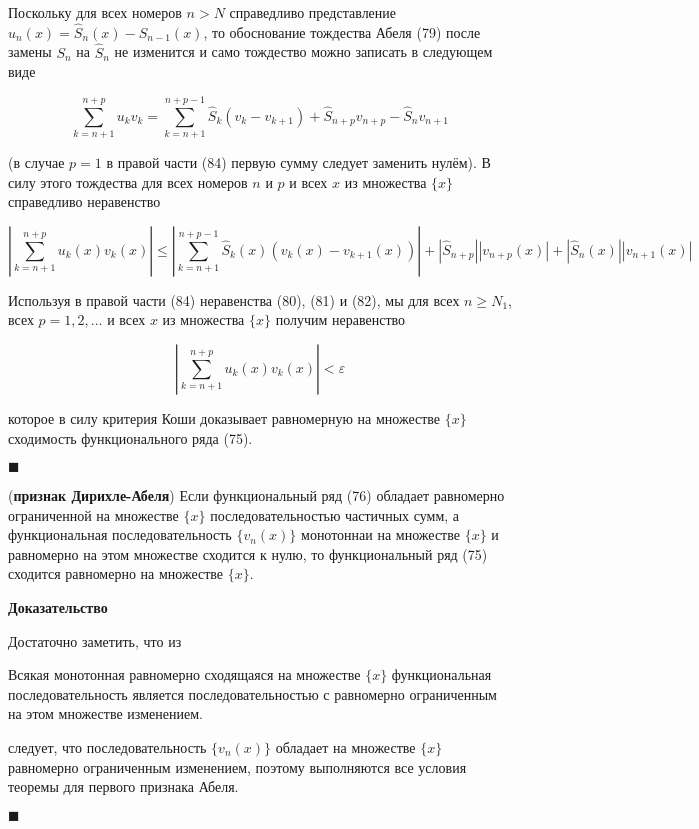 \begin{enumerate}
	Поскольку для всех номеров $n > N$ справедливо представление $u_n(x) = \hat{S}_n(x) - \hat{S}_{n - 1}(x)$, то обоснование тождества Абеля (79) после замены $S_n$ на $\hat{S}_n$ не изменится и само тождество можно записать в следующем виде
	
	\begin{equation}
		\displaystyle\sum_{k = n + 1}^{n + p} u_kv_k = \displaystyle\sum_{k = n + 1}^{n + p -1} \hat{S}_k (v_k - v_{k + 1}) + \hat{S}_{n + p}v_{n + p} - \hat{S}_nv_{n + 1}
	\end{equation}
	
	(в случае $p = 1$ в правой части (84) первую сумму следует заменить нулём). В силу этого тождества для всех номеров $n$ и $p$ и всех $x$ из множества $\{x\}$ справедливо неравенство
	
	\begin{equation}
		\left| \displaystyle\sum_{k = n + 1}^{n + p} u_k(x)v_k(x) \right| \leqslant\left| \displaystyle\sum_{k = n + 1}^{n + p - 1} \hat{S}_k(x)(v_k(x) - v_{k + 1}(x)) \right| + \left| \hat{S}_{n + p} \right| |v_{n + p}(x)| + \left| \hat{S}_n(x) \right| |v_{n + 1}(x)|
	\end{equation}
	
	Используя в правой части (84) неравенства (80), (81) и (82), мы для всех $n \geqslant N_1$, всех $p = 1, 2, ...$ и всех $x$ из множества $\{x\}$ получим неравенство
	
	\begin{equation*}
		\left| \displaystyle\sum_{k = n + 1}^{n + p} u_k(x) v_k(x) \right| < \varepsilon
	\end{equation*}
	
	которое в силу критерия Коши доказывает равномерную на множестве $\{x\}$ сходимость функционального ряда (75).
\end{enumerate}

\begin{flushright}
	$\blacksquare$
\end{flushright}

\begin{theorem}
	(\textbf{признак Дирихле-Абеля}) Если функциональный ряд (76) обладает равномерно ограниченной на множестве $\{x\}$ последовательностью частичных сумм, а функциональная последовательность $\{v_n(x)\}$ монотоннаи на множестве $\{x\}$ и равномерно на этом множестве сходится к нулю, то функциональный ряд (75) сходится равномерно на множестве $\{x\}$.
\end{theorem}
\textbf{Доказательство}

Достаточно заметить, что из

\begin{statm}
	Всякая монотонная равномерно сходящаяся на множестве $\{x\}$ функциональная последовательность является последовательностью с равномерно ограниченным на этом множестве изменением.
\end{statm}

следует, что последовательность $\{v_n(x)\}$ обладает на множестве $\{x\}$ равномерно ограниченным изменением, поэтому выполняются все условия теоремы для первого признака Абеля.

\begin{flushright}
	$\blacksquare$
\end{flushright}